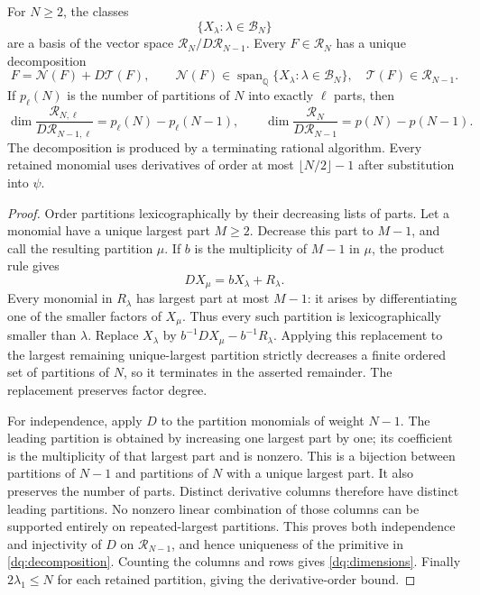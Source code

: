 \begin{theorem}
\label{dq:normalform}
For $N\ge2$, the classes
\[
 \{X_\lambda:\lambda\in\mathscr B_N\}
\]
are a basis of the vector space $\mathscr R_N/D\mathscr R_{N-1}$.
Every $F\in\mathscr R_N$ has a unique decomposition
\begin{equation}\label{dq:decomposition}
 F=\mathcal N(F)+D\mathcal T(F),\qquad
 \mathcal N(F)\in\operatorname{span}_{\mathbb Q}
                 \{X_\lambda:\lambda\in\mathscr B_N\},
 \quad\mathcal T(F)\in\mathscr R_{N-1}.
\end{equation}
If $p_\ell(N)$ is the number of partitions of $N$ into exactly
$\ell$ parts, then
\begin{equation}\label{dq:dimensions}
 \dim \frac{\mathscr R_{N,\ell}}{D\mathscr R_{N-1,\ell}}
   =p_\ell(N)-p_\ell(N-1),\qquad
 \dim \frac{\mathscr R_N}{D\mathscr R_{N-1}}
   =p(N)-p(N-1).
\end{equation}
The decomposition is produced by a terminating rational algorithm.
Every retained monomial uses derivatives of order at most
$\lfloor N/2\rfloor-1$ after substitution into $\psi$.
\end{theorem}

\begin{proof}
Order partitions lexicographically by their decreasing lists of parts.
Let a monomial have a unique largest part $M\ge2$. Decrease this
part to $M-1$, and call the resulting partition $\mu$. If $b$ is
the multiplicity of $M-1$ in $\mu$, the product rule gives
\begin{equation}\label{dq:pivot}
 D X_\mu=bX_\lambda+R_\lambda.
\end{equation}
Every monomial in $R_\lambda$ has largest part at most $M-1$:
it arises by differentiating one of the smaller factors of $X_\mu$.
Thus every such partition is lexicographically smaller than $\lambda$.
Replace $X_\lambda$ by $b^{-1}DX_\mu-b^{-1}R_\lambda$.
Applying this replacement to the largest remaining unique-largest
partition strictly decreases a finite ordered set of partitions of $N$,
so it terminates in the asserted remainder. The replacement preserves
factor degree.

For independence, apply $D$ to the partition monomials of weight $N-1$.
The leading partition is obtained by increasing one largest part by one;
its coefficient is the multiplicity of that largest part and is nonzero.
This is a bijection between partitions of $N-1$ and partitions of $N$
with a unique largest part. It also preserves the number of parts.
Distinct derivative columns therefore have distinct leading partitions.
No nonzero linear combination of those columns can be supported entirely
on repeated-largest partitions. This proves both independence and
injectivity of $D$ on $\mathscr R_{N-1}$, and hence uniqueness of
the primitive in \eqref{dq:decomposition}. Counting the columns and
rows gives \eqref{dq:dimensions}. Finally $2\lambda_1\le N$ for
each retained partition, giving the derivative-order bound.
\end{proof}

